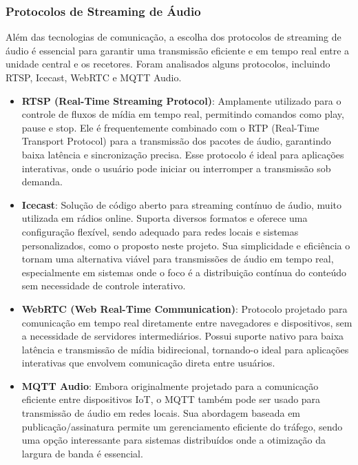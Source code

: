 \documentclass{article}
\begin{document}
\subsubsection{Protocolos de Streaming de \'Audio}
Al\'em das tecnologias de comunica\c{c}\~ao, a escolha dos protocolos de streaming de \'audio \'e essencial para garantir uma transmiss\~ao eficiente e em tempo real entre a unidade central e os recetores. Foram analisados alguns protocolos, incluindo RTSP, Icecast, WebRTC e MQTT Audio.

\begin{itemize}
    \item \textbf{RTSP (Real-Time Streaming Protocol)}: Amplamente utilizado para o controle de fluxos de m\'idia em tempo real, permitindo comandos como play, pause e stop. Ele \'e frequentemente combinado com o RTP (Real-Time Transport Protocol) para a transmiss\~ao dos pacotes de \'audio, garantindo baixa lat\^encia e sincroniza\c{c}\~ao precisa. Esse protocolo \'e ideal para aplica\c{c}\~oes interativas, onde o usu\'ario pode iniciar ou interromper a transmiss\~ao sob demanda.
    \item \textbf{Icecast}: Solu\c{c}\~ao de c\'odigo aberto para streaming cont\'inuo de \'audio, muito utilizada em r\'adios online. Suporta diversos formatos e oferece uma configura\c{c}\~ao flex\'ivel, sendo adequado para redes locais e sistemas personalizados, como o proposto neste projeto. Sua simplicidade e efici\^encia o tornam uma alternativa vi\'avel para transmiss\~oes de \'audio em tempo real, especialmente em sistemas onde o foco \'e a distribui\c{c}\~ao cont\'inua do conte\'udo sem necessidade de controle interativo.
    \item \textbf{WebRTC (Web Real-Time Communication)}: Protocolo projetado para comunica\c{c}\~ao em tempo real diretamente entre navegadores e dispositivos, sem a necessidade de servidores intermedi\'arios. Possui suporte nativo para baixa lat\^encia e transmiss\~ao de m\'idia bidirecional, tornando-o ideal para aplica\c{c}\~oes interativas que envolvem comunica\c{c}\~ao direta entre usu\'arios.
    \item \textbf{MQTT Audio}: Embora originalmente projetado para a comunica\c{c}\~ao eficiente entre dispositivos IoT, o MQTT tamb\'em pode ser usado para transmiss\~ao de \'audio em redes locais. Sua abordagem baseada em publica\c{c}\~ao/assinatura permite um gerenciamento eficiente do tr\'afego, sendo uma op\c{c}\~ao interessante para sistemas distribu\'idos onde a otimiza\c{c}\~ao da largura de banda \'e essencial.
\end{itemize}
\end{document}
